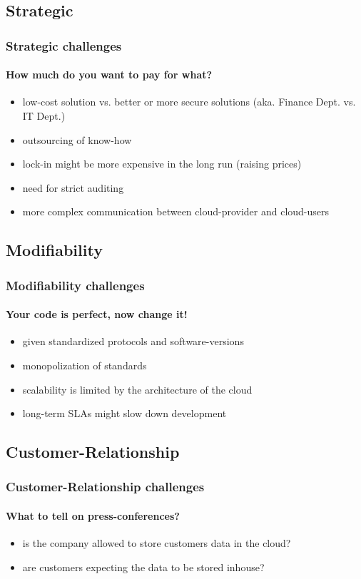 \documentclass[]{beamer}
\begin{document}
\subsection{Strategic}

\begin{frame}
        \frametitle{Strategic challenges}
        \framesubtitle{How much do you want to pay for what?}
        \begin{itemize}
                \item low-cost solution vs. better or more secure solutions
                (aka. Finance Dept. vs. IT Dept.)
                \item outsourcing of know-how
                \item lock-in might be more expensive in the long run (raising
                prices)
                \item need for strict auditing
                \item more complex communication between cloud-provider and
                cloud-users
        \end{itemize}
\end{frame}

\subsection{Modifiability}

\begin{frame}
        \frametitle{Modifiability challenges}
        \framesubtitle{Your code is perfect, now change it!}
        \begin{itemize}
                \item given standardized protocols and software-versions
                \item monopolization of standards
                \item scalability is limited by the architecture of the cloud
                \item long-term SLAs might slow down development
        \end{itemize}
\end{frame}

\subsection{Customer-Relationship}

\begin{frame}
        \frametitle{Customer-Relationship challenges}
        \framesubtitle{What to tell on press-conferences?}
        \begin{itemize}
                \item is the company allowed to store customers data in the
                cloud?
                \item are customers expecting the data to be stored inhouse?
        \end{itemize}
\end{frame}
\end{document}
